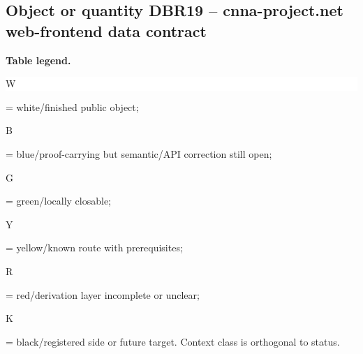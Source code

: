 \subsection*{Object or quantity DBR19 -- cnna-project.net web-frontend data contract}
\hypertarget{objproof:DBR19}{}
\par\smallskip\noindent\begin{minipage}{0.99\linewidth}\footnotesize\raggedright\textbf{Table legend.} \colorbox{white}{\strut W} = white/finished public object; \colorbox{cyan!20}{\strut B} = blue/proof-carrying but semantic/API correction still open; \colorbox{green!18}{\strut G} = green/locally closable; \colorbox{yellow!25}{\strut Y} = yellow/known route with prerequisites; \colorbox{red!20}{\strut R} = red/derivation layer incomplete or unclear; \colorbox{black!18}{\strut K} = black/registered side or future target. Context class is orthogonal to status.\end{minipage}\par\vspace{0.25em}
